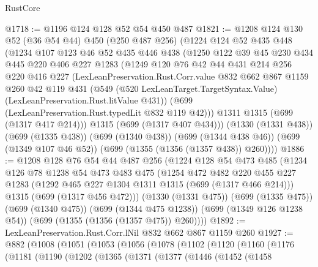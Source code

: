 \begin{lexlean}{RustCore}
\begin{coremodule}
@1718 := @1196 @124 @128 @52 @54 @450 @487
@1821 := @1208
    @124
    @130
    @52
    (@36 @54 @44)
    @450
    (@250 @487 @256)
    (@1224
      @124
      @52
      @435
      @448
      (@1234
        @107
        @123
        @46
        @52
        @435
        @446
        @438
        (@1250
          @122
          @39
          @45
          @230
          @434
          @445
          @220
          @406
          @227
          @1283
          (@1249
            @120
            @76
            @42
            @44
            @431
            @214
            @256
            @220
            @416
            @227
            (LexLeanPreservation.Rust.Corr.value
              @832
              @662
              @867
              @1159
              @260
              @42
              @119
              @431
              (@549
                (@520 LexLeanTarget.TargetSyntax.Value)
                (LexLeanPreservation.Rust.litValue @431))
              (@699 (LexLeanPreservation.Rust.typedLit @832 @119 @42)))
            @1311
            @1315
            (@699 (@1317 @417 @214)))
          @1315
          (@699 (@1317 @407 @434)))
        (@1330 (@1331 @438))
        (@699 (@1335 @438))
        (@699 (@1340 @438))
        (@699 (@1344 @438 @46))
        (@699 (@1349 @107 @46 @52))
        (@699 (@1355 (@1356 (@1357 @438)) @260))))
@1886 := @1208
    @128
    @76
    @54
    @44
    @487
    @256
    (@1224
      @128
      @54
      @473
      @485
      (@1234
        @126
        @78
        @1238
        @54
        @473
        @483
        @475
        (@1254
          @472
          @482
          @220
          @455
          @227
          @1283
          (@1292 @465 @227 @1304 @1311 @1315 (@699 (@1317 @466 @214)))
          @1315
          (@699 (@1317 @456 @472)))
        (@1330 (@1331 @475))
        (@699 (@1335 @475))
        (@699 (@1340 @475))
        (@699 (@1344 @475 @1238))
        (@699 (@1349 @126 @1238 @54))
        (@699 (@1355 (@1356 (@1357 @475)) @260))))
@1892 := LexLeanPreservation.Rust.Corr.lNil @832 @662 @867 @1159 @260
@1927 := @882
    (@1008
      (@1051
        (@1053
          (@1056
            (@1078
              (@1102
                (@1120
                  (@1160
                    (@1176
                      (@1181
                        (@1190
                          (@1202
                            (@1365
                              (@1371
                                (@1377
                                  (@1446
                                    (@1452
                                      (@1458

\end{coremodule}
\end{lexlean}
